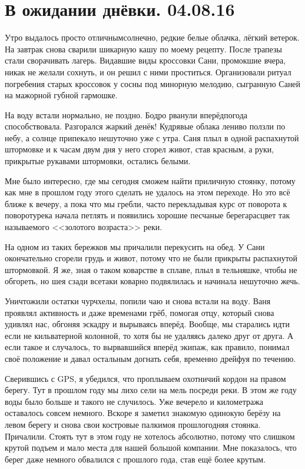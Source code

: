 \chapter{В ожидании днёвки. 04.08.16} 

Утро выдалось просто отличным\mdash  солнечно, редкие белые облачка, лёгкий ветерок. На завтрак снова сварили шикарную кашу по моему рецепту. После трапезы стали сворачивать лагерь. Видавшие виды кроссовки Сани, промокшие вчера, никак не желали сохнуть, и он решил с ними проститься. Организовали ритуал погребения старых кроссовок у сосны под минорную мелодию, сыгранную Саней на мажорной губной гармошке.

На воду встали нормально, не поздно.  Бодро рванули вперёд\mdash  погода способствовала. Разгорался жаркий денёк! Кудрявые облака лениво ползли по небу, а солнце припекало нешуточно уже с утра. Саня плыл в одной распахнутой штормовке и к часам двум дня у него сгорел живот, став красным, а руки, прикрытые рукавами штормовки, остались белыми. 

Мне было интересно, где мы сегодня сможем найти приличную стоянку, потому как мне в прошлом году этого сделать не удалось на этом переходе. Но это всё ближе к вечеру, а пока что мы гребли, часто перекладывая курс от поворота к повороту\mdash  река начала петлять и появились хорошие песчаные берега\mdash  расцвет так называемого <<золотого возраста>> реки.

На одном из таких бережков мы причалили перекусить на обед. У Сани окончательно сгорели грудь и живот, потому что не были прикрыты распахнутой штормовкой. Я же, зная о таком коварстве в сплаве, плыл в тельняшке, чтобы не обгореть, но шея сзади все\sdash таки коварно подвялилась и начинала нешуточно жечь.

Уничтожили остатки чурчхелы, попили чаю и снова встали на воду. Ваня проявлял активность и даже временами грёб, помогая отцу, который снова удивлял нас, обгоняя эскадру и вырываясь вперёд. Вообще, мы старались идти если не кильватерной колонной, то хотя бы не удаляясь далеко друг от друга. А если такое и случалось, то вырвавшийся вперёд экипаж, как правило, понимал своё положение и давал остальным догнать себя, временно дрейфуя по течению.

Сверившись с GPS, я убедился, что проплываем охотничий кордон на правом берегу. Тут в прошлом году мы лихо сели на мель посреди реки. В этом же году воды было больше и такого не случилось. Уже вечерело и километража оставалось совсем немного. Вскоре я заметил знакомую одинокую берёзу на левом берегу и снова свои костровые палки\mdash  моя прошлогодняя стоянка. Причалили. Стоять тут в этом году не хотелось абсолютно, потому что слишком крутой подъем и мало места для нашей большой компании. Мне показалось, что берег даже немного обвалился с прошлого года, став ещё более крутым.

